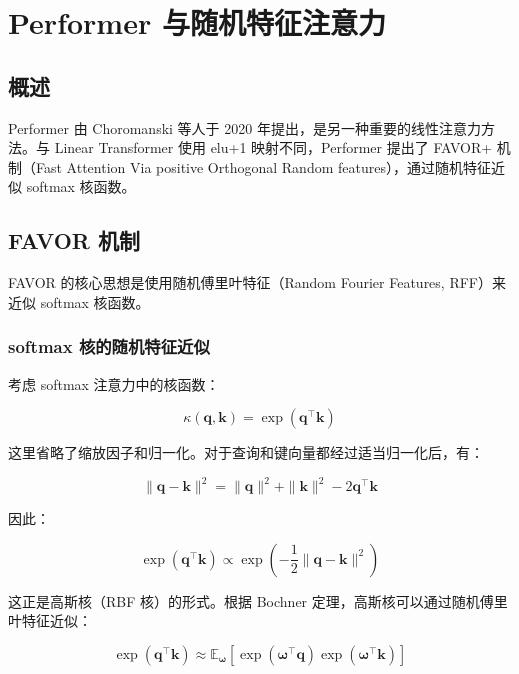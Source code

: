 \chapter{Performer 与随机特征注意力}

\section{概述}

Performer 由 Choromanski 等人于 2020 年提出，是另一种重要的线性注意力方法。与 Linear Transformer 使用 elu+1 映射不同，Performer 提出了 FAVOR+ 机制（Fast Attention Via positive Orthogonal Random features），通过随机特征近似 softmax 核函数。

\section{FAVOR 机制}

FAVOR 的核心思想是使用随机傅里叶特征（Random Fourier Features, RFF）来近似 softmax 核函数。

\subsection{softmax 核的随机特征近似}

考虑 softmax 注意力中的核函数：

\begin{equation}
    \kappa(\mathbf{q}, \mathbf{k}) = \exp(\mathbf{q}^\top \mathbf{k})
\end{equation}

这里省略了缩放因子和归一化。对于查询和键向量都经过适当归一化后，有：

\begin{equation}
    \|\mathbf{q} - \mathbf{k}\|^2 = \|\mathbf{q}\|^2 + \|\mathbf{k}\|^2 - 2\mathbf{q}^\top \mathbf{k}
\end{equation}

因此：

\begin{equation}
    \exp(\mathbf{q}^\top \mathbf{k}) \propto \exp\left(-\frac{1}{2}\|\mathbf{q} - \mathbf{k}\|^2\right)
\end{equation}

这正是高斯核（RBF 核）的形式。根据 Bochner 定理，高斯核可以通过随机傅里叶特征近似：

\begin{equation}
    \exp(\mathbf{q}^\top \mathbf{k}) \approx \mathbb{E}_{\boldsymbol{\omega}}\left[\exp(\boldsymbol{\omega}^\top \mathbf{q}) \exp(\boldsymbol{\omega}^\top \mathbf{k})\right]
\end{equation}

